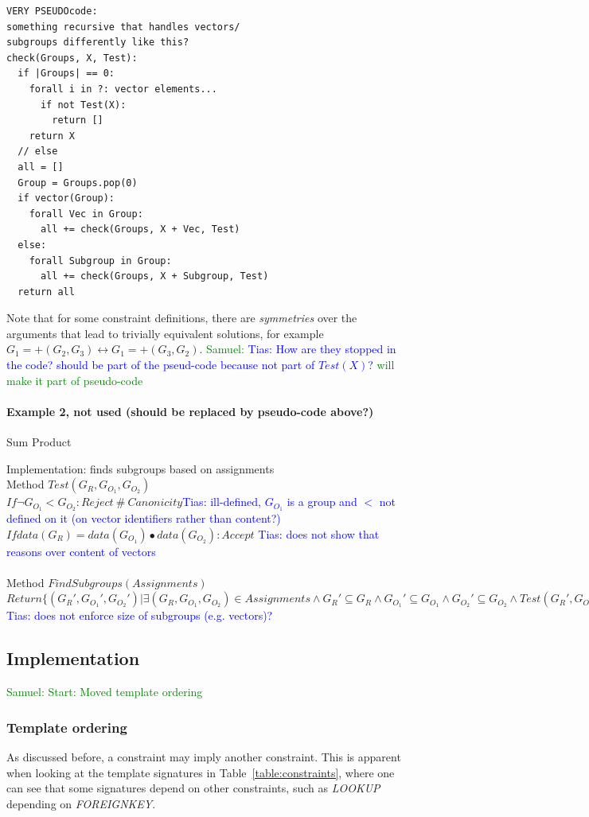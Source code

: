 \documentclass{IEEEtran}
\newcommand{\samuel}[1]{\textcolor{green}{{\sc Samuel:} #1}\xspace}
\newcommand{\tias}[1]{\textcolor{blue}{{\sc Tias:} #1}\xspace}
\theoremstyle{definition}
\begin{document}
\begin{verbatim}
VERY PSEUDOcode:
something recursive that handles vectors/
subgroups differently like this?
check(Groups, X, Test):
  if |Groups| == 0:
    forall i in ?: vector elements...
      if not Test(X):
        return []
    return X
  // else
  all = []
  Group = Groups.pop(0)
  if vector(Group):
    forall Vec in Group:
      all += check(Groups, X + Vec, Test)
  else:
    forall Subgroup in Group:
      all += check(Groups, X + Subgroup, Test)
  return all
\end{verbatim}

Note that for some constraint definitions, there are \textit{symmetries} over the arguments that lead to trivially equivalent solutions, for example $G_1 = +(G_2, G_3) \leftrightarrow G_1 = +(G_3, G_2)$. \samuel{\tias{How are they stopped in the code? should be part of the pseud-code because not part of $Test(X)$?} will make it part of pseudo-code}

\paragraph{Example 2, not used (should be replaced by pseudo-code above?)}
Sum Product

Implementation: finds subgroups based on assignments\\
Method $Test(G_R, G_{O_1}, G_{O_2})$\\
$If \lnot G_{O_1} < G_{O_2}: Reject~\#~Canonicity$\tias{ill-defined, $G_{O_1}$ is a group and $<$ not defined on it (on vector identifiers rather than content?)}\\
$If data(G_R) = data(G_{O_1}) \bullet data(G_{O_2}): Accept$ \tias{does not show that reasons over content of vectors}
\\\\
Method $FindSubgroups(Assignments)$\\
$Return \{ (G_R', G_{O_1}', G_{O_2}') | \exists (G_R, G_{O_1}, G_{O_2}) \in Assignments \land G_R' \subseteq G_R \land G_{O_1}' \subseteq G_{O_1} \land G_{O_2}' \subseteq G_{O_2} \land Test(G_R', G_{O_1}', G_{O_2}') \}$ \tias{does not enforce size of subgroups (e.g. vectors)?}


\subsection{Implementation}

\samuel{Start: Moved template ordering}
\subsubsection{Template ordering}
As discussed before, a constraint may imply another constraint. This is apparent when looking at the template signatures in Table~\ref{table:constraints}, where one can see that some signatures depend on other constraints, such as \textit{LOOKUP} depending on \textit{FOREIGNKEY}.
\end{document}
